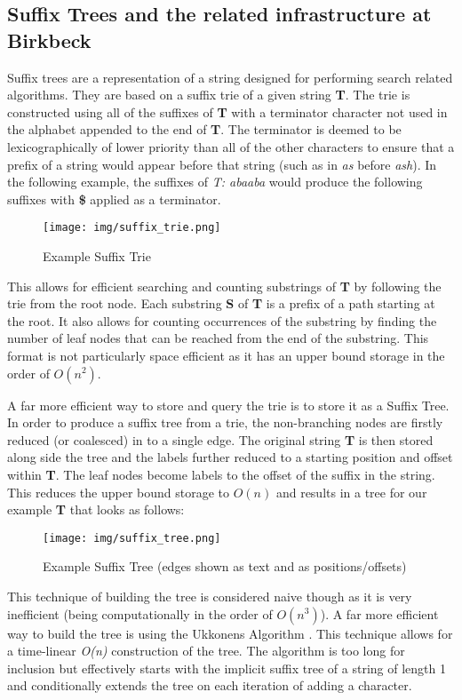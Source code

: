 \documentclass[11pt]{scrartcl}
\begin{document}
\subsection{Suffix Trees and the related infrastructure at Birkbeck}
	Suffix trees \citep{suffix} are a representation of a string designed for performing search related algorithms.  They are based on a suffix trie of a given string \textbf{T}.  The trie is constructed using all of the suffixes of \textbf{T} with a terminator character not used in the alphabet appended to the end of \textbf{T}.  The terminator is deemed to be lexicographically of lower priority than all of the other characters to ensure that a prefix of a string would appear before that string (such as in \textit{as} before \textit{ash}). In the following example, the suffixes of \textit{T: abaaba} would produce the following suffixes with \textbf{\$} applied as a terminator.
	\begin{figure}[h]
		\centering
		\texttt{[image: img/suffix\_trie.png]}
		\caption{Example Suffix Trie}
	\end{figure}
	
	This allows for efficient searching and counting substrings of \textbf{T} by following the trie from the root node.  Each substring \textbf{S} of \textbf{T} is a prefix of a path starting at the root.  It also allows for counting occurrences of the substring by finding the number of leaf nodes that can be reached from the end of the substring.  This format is not particularly space efficient as it has an upper bound storage in the order of \textit{$O(n^{2})$}.
	
	A far more efficient way to store and query the trie is to store it as a Suffix Tree.  In order to produce a suffix tree from a trie, the non-branching nodes are firstly reduced (or coalesced) in to a single edge.  The original string \textbf{T} is then stored along side the tree and the labels further reduced to a starting position and offset within \textbf{T}.  The leaf nodes become labels to the offset of the suffix in the string.  This reduces the upper bound storage to \textit{$O(n)$} and results in a tree for our example \textbf{T} that looks as follows:
	\begin{figure}[h]
		\centering
		\texttt{[image: img/suffix\_tree.png]}
		\caption{Example Suffix Tree (edges shown as text and as positions/offsets)}
	\end{figure}
	
	This technique of building the tree is considered naive though as it is very inefficient (being computationally in the order of \textit{$O(n^{3})$}).  A far more efficient way to build the tree is using the Ukkonens Algorithm \citep{ukkonens}.  This technique allows for a time-linear \textit{O(n)} construction of the tree.  The algorithm is too long for inclusion but effectively starts with the implicit suffix tree of a string of length 1 and conditionally extends the tree on each iteration of adding a character.
	
\end{document}
